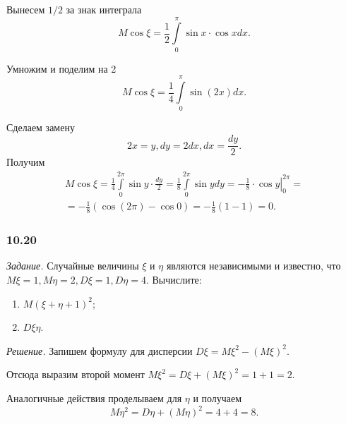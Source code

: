 Вынесем $1/2$ за знак интеграла
$$M \cos \xi =
\frac{1}{2} \int \limits_0^{ \pi } \sin x \cdot \cos x dx.$$

Умножим и поделим на 2
$$M \cos \xi =
\frac{1}{4} \int \limits_0^{ \pi } \sin \left( 2x \right) dx.$$

Сделаем замену
$$2x = y,
dy = 2dx,
dx = \frac{dy}{2}.$$
Получим
\begin{equation*}
\begin{split}
M \cos \xi =
\frac{1}{4} \int \limits_0^{2 \pi } \sin y \cdot \frac{dy}{2} =
\frac{1}{8} \int \limits_0^{2 \pi } \sin y dy =
\left. - \frac{1}{8} \cdot \cos y \right|_0^{2 \pi} = \\
= - \frac{1}{8} \left( \cos \left( 2 \pi \right) - \cos 0 \right) =
- \frac{1}{8} \left( 1 - 1 \right) =
0.
\end{split}
\end{equation*}

\subsubsection*{10.20}

\textit{Задание.} Случайные величины $ \xi $ и $ \eta $ являются независимыми и известно, что $M \xi = 1, M \eta = 2, D \xi = 1, D \eta = 4$.
Вычислите:
\begin{enumerate}[label=\alph*)]
\item $M \left( \xi + \eta + 1 \right)^2$;
\item $D \xi \eta $.
\end{enumerate}

\textit{Решение.} Запишем формулу для дисперсии $D \xi = M \xi^2 - \left( M \xi \right)^2$.

Отсюда выразим второй момент $M \xi^2 = D \xi + \left( M \xi \right)^2 = 1 + 1 = 2$.

Аналогичные действия проделываем для $ \eta $ и получаем
$$M \eta^2 =
D \eta + \left( M \eta \right)^2 =
4 + 4 =
8.$$

